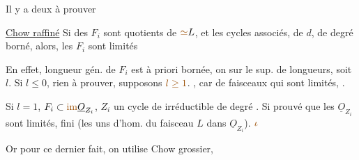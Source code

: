Il y a deux  à prouver

\uline{Chow raffiné} Si des $F_i$ sont quotients de  $\unsure{\simeq}L$, et  les cycles associés, de  $d$, de degré borné, alors, les $F_i$ sont limités

En effet, longueur gén. de $F_i$ est à priori bornée, on  sur le sup. de  longueurs, soit $l$.
Si $l\leq0$, rien à prouver, supposons $\unsure{l\geq1}$.
  ,   car   de faisceaux qui sont limités,  .

Si $l=1$, $F_i\subset\deleted{\unsure{\operatorname{im}}}\underline{O}_{Z_i}$, $Z_i$ un cycle de  irréductible de degré . Si    prouvé que les $\underline{O}_{Z_i}$ sont limités,  fini (les uns  d'hom.  du faisceau $L$ dans $\underline{O}_{Z_i}$). $\unsure{\iota}$

Or pour ce dernier fait, on utilise Chow grossier,

